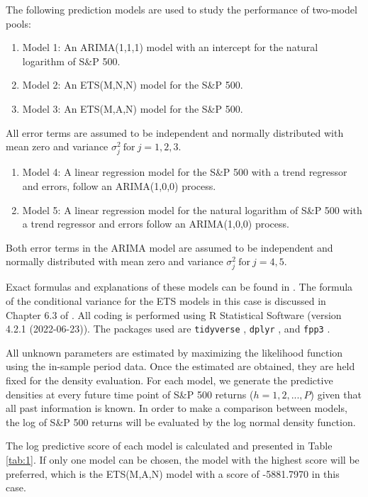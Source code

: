 \documentclass{monashthesis}
\begin{document}
The following prediction models are used to study the performance of two-model pools:

\begin{enumerate}
\def\labelenumi{\arabic{enumi}.}
\tightlist
\item
  Model 1: An ARIMA(1,1,1) model with an intercept for the natural logarithm of S\&P 500.
\item
  Model 2: An ETS(M,N,N) model for the S\&P 500.
\item
  Model 3: An ETS(M,A,N) model for the S\&P 500.
\end{enumerate}

All error terms are assumed to be independent and normally distributed with mean zero and variance \(\sigma_j^2 \ \text{for}\  j = 1,2,3\).

\begin{enumerate}
\def\labelenumi{\arabic{enumi}.}
\setcounter{enumi}{3}
\tightlist
\item
  Model 4: A linear regression model for the S\&P 500 with a trend regressor and errors, follow an ARIMA(1,0,0) process.
\item
  Model 5: A linear regression model for the natural logarithm of S\&P 500 with a trend regressor and errors follow an ARIMA(1,0,0) process.
\end{enumerate}

Both error terms in the ARIMA model are assumed to be independent and normally distributed with mean zero and variance \(\sigma_j^2 \ \text{for}\  j = 4,5\).

Exact formulas and explanations of these models can be found in \textcite{fpp3}. The formula of the conditional variance for the ETS models in this case is discussed in Chapter 6.3 of \textcite{HKOS08}. All coding is performed using R Statistical Software (version 4.2.1 (2022-06-23)). The packages used are \texttt{tidyverse} \autocite{tidy19}, \texttt{dplyr} \autocite{dplyr23}, and \texttt{fpp3} \autocite{fpp23}.

All unknown parameters are estimated by maximizing the likelihood function using the in-sample period data. Once the estimated are obtained, they are held fixed for the density evaluation. For each model, we generate the predictive densities at every future time point of S\&P 500 returns (\(h=1,2,...,P\)) given that all past information is known. In order to make a comparison between models, the log of S\&P 500 returns will be evaluated by the log normal density function.

The log predictive score of each model is calculated and presented in Table \ref{tab:1}. If only one model can be chosen, the model with the highest score will be preferred, which is the ETS(M,A,N) model with a score of -5881.7970 in this case.
\end{document}
